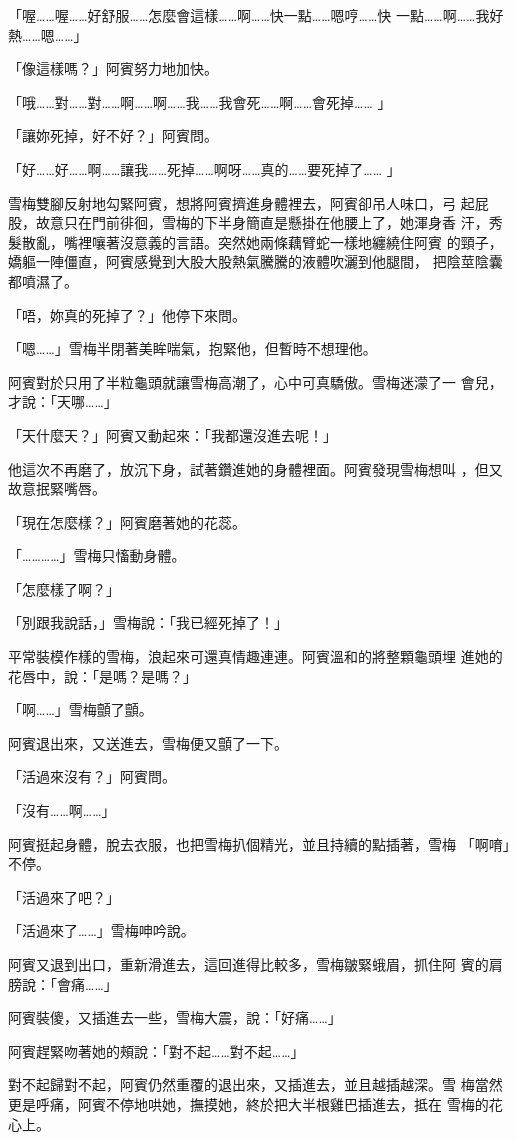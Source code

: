 「喔……喔……好舒服……怎麼會這樣……啊……快一點……嗯哼……快
一點……啊……我好熱……嗯……」

「像這樣嗎？」阿賓努力地加快。

「哦……對……對……啊……啊……我……我會死……啊……會死掉……
」

「讓妳死掉，好不好？」阿賓問。

「好……好……啊……讓我……死掉……啊呀……真的……要死掉了……
」

雪梅雙腳反射地勾緊阿賓，想將阿賓擠進身體裡去，阿賓卻吊人味口，弓
起屁股，故意只在門前徘徊，雪梅的下半身簡直是懸掛在他腰上了，她渾身香
汗，秀髮散亂，嘴裡嚷著沒意義的言語。突然她兩條藕臂蛇一樣地纏繞住阿賓
的頸子，嬌軀一陣僵直，阿賓感覺到大股大股熱氣騰騰的液體吹灑到他腿間，
把陰莖陰囊都噴濕了。

「唔，妳真的死掉了？」他停下來問。

「嗯……」雪梅半閉著美眸喘氣，抱緊他，但暫時不想理他。

阿賓對於只用了半粒龜頭就讓雪梅高潮了，心中可真驕傲。雪梅迷濛了一
會兒，才說：「天哪……」

「天什麼天？」阿賓又動起來：「我都還沒進去呢！」

他這次不再磨了，放沉下身，試著鑽進她的身體裡面。阿賓發現雪梅想叫
，但又故意抿緊嘴唇。

「現在怎麼樣？」阿賓磨著她的花蕊。

「…………」雪梅只慉動身體。

「怎麼樣了啊？」

「別跟我說話，」雪梅說：「我已經死掉了！」

平常裝模作樣的雪梅，浪起來可還真情趣連連。阿賓溫和的將整顆龜頭埋
進她的花唇中，說：「是嗎？是嗎？」

「啊……」雪梅顫了顫。

阿賓退出來，又送進去，雪梅便又顫了一下。

「活過來沒有？」阿賓問。

「沒有……啊……」

阿賓挺起身體，脫去衣服，也把雪梅扒個精光，並且持續的點插著，雪梅
「啊唷」不停。

「活過來了吧？」

「活過來了……」雪梅呻吟說。

阿賓又退到出口，重新滑進去，這回進得比較多，雪梅皺緊蛾眉，抓住阿
賓的肩膀說：「會痛……」

阿賓裝傻，又插進去一些，雪梅大震，說：「好痛……」

阿賓趕緊吻著她的頰說：「對不起……對不起……」

對不起歸對不起，阿賓仍然重覆的退出來，又插進去，並且越插越深。雪
梅當然更是呼痛，阿賓不停地哄她，撫摸她，終於把大半根雞巴插進去，抵在
雪梅的花心上。

